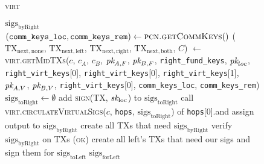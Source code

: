 \begin{figure}[H]
\begin{processbox}{\textsc{virt}}
\begin{algorithmic}[1]
{            $\mathrm{sigs}_{\mathrm{byRight}}$} \TODO{}
            \State {}
            \TODO{}
            \State {} 
          \EndIf
        \Else \: 
          \State $(\texttt{comm\_keys\_loc}, \texttt{comm\_keys\_rem}) \gets
          \textsc{pcn.getCommKeys}()$
          \State ($\mathrm{TX}_{\mathrm{next}, \mathrm{none}}$,
          $\mathrm{TX}_{\mathrm{next}, \mathrm{left}}$,
          $\mathrm{TX}_{\mathrm{next}, \mathrm{right}}$,
          $\mathrm{TX}_{\mathrm{next}, \mathrm{both}}$, $C$) $\gets$
          \textsc{virt.getMidTXs}($c$, $c_A$, $c_B$, $\textit{pk}_{A, F}$, $\textit{pk}_{B, F}$,
          \texttt{right\_fund\_keys}, $\textit{pk}_{loc}$, \texttt{right\_virt\_keys}[0],
          \texttt{right\_virt\_keys}[0], \texttt{right\_virt\_keys}[1], $\textit{pk}_{A,
          V}$, $\textit{pk}_{B, V}$, \texttt{right\_virt\_keys}[0],
          \texttt{comm\_keys\_loc}, \texttt{comm\_keys\_rem})
          \State $\mathrm{sigs}_{\mathrm{toRight}} \gets \emptyset$
            \State add \textsc{sign}(TX, $\textit{sk}_{\mathrm{loc}}$) to
            $\mathrm{sigs}_{\mathrm{toRight}}$
          \EndFor
          \State call \textsc{virt.circulateVirtualSigs}($c$, \texttt{hops},
          $\mathrm{sigs}_{\mathrm{toRight}}$) of \texttt{hops}[0].\bob and
          assign output to $\mathrm{sigs}_{\mathrm{byRight}}$
          \State create all TXs that need $\mathrm{sigs}_{\mathrm{byRight}}$
          \TODO{}
          \State verify $\mathrm{sigs}_{\mathrm{byRight}}$ on TXs \TODO{}
          \State \Return (\textsc{ok})
        \EndIf
         
          \State create all left's TXs that need our sigs and sign
          them for $\mathrm{sigs}_{\mathrm{toLeft}}$ \TODO{}
          \State \Return $\mathrm{sigs}_{\mathrm{forLeft}}$
        \EndIf
      \EndIndent
    \end{algorithmic}
  \end{processbox}
  \caption{}
  \label{code:virtual-layer:virtual-sigs}
\end{figure}

